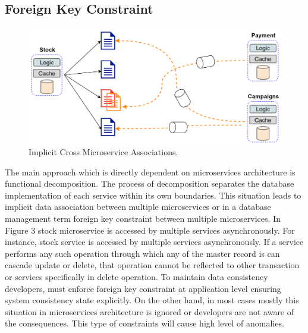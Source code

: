 \documentclass[a4paper,12pt]{article}
\begin{document}
\subsection{Foreign Key Constraint }
\begin{figure}[h!]
    \begin{center}
	    \includegraphics[width=0.7\columnwidth]{img/foreignkey.png}
    \end{center}
	\caption{Implicit Cross Microservice Associations.}
	\label{fig:microarch}
\end{figure}
The main approach which is directly dependent on microservices architecture is functional decomposition. The process of decomposition separates the database implementation of each service within its own boundaries. \cite{six, eight} This situation leads to implicit data association between multiple microservices or in a database management term foreign key constraint between multiple microservices. In Figure 3 stock microservice is accessed by multiple services asynchronously. For instance, stock service is accessed by multiple services asynchronously. \cite{cite-36, cite-38} If a service performs any such operation through which any of the master record is can cascade update or delete, that operation cannot be reflected to other transaction or services specifically in delete operation.\cite{seventeen}
To maintain data consistency developers, must enforce foreign key constraint at application level ensuring system consistency state explicitly. On the other hand, in most cases mostly this situation in microservices architecture is ignored or developers are not aware of the consequences. This type of constraints will cause high level of anomalies.\cite{one, three, four}
\end{document}
